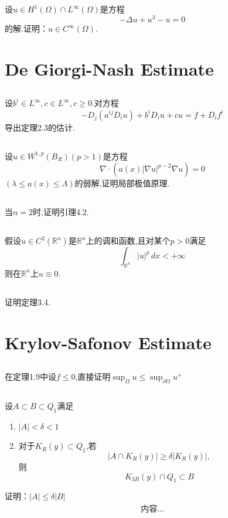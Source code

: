 \documentclass{ctexart}
\numberwithin{equation}{section}
\theoremstyle{plain}
\theoremstyle{plain}
\numberwithin{equation}{section}
\theoremstyle{remark}
\begin{document}
\subsection{}
设$u \in H^1(\Omega) \cap L^{\infty}(\Omega)$是方程
$$-\Delta u+u^3-u=0$$
的解.证明：$u \in C^{\infty}(\Omega)$.

\section{De Giorgi-Nash Estimate}
\subsection{}
设$b^i \in L^{\infty},c \in L^{\infty},c \geqslant 0 .$对方程
$$-D_j(a^{ij}D_iu)+b^iD_iu+cu=f+D_if^i$$
导出定理2.3的估计.
\subsection{}
设$u \in W^{1,p}(B_R)(p>1)$是方程
$$\nabla \cdot(a(x)|\nabla u|^{p-2}\nabla u)=0$$
$(\lambda \leqslant a(x) \leqslant \Lambda)$的弱解,证明局部极值原理.
\subsection{}
当$n=2$时,证明引理4.2.
\subsection{}
假设$u \in C^2(\mathbb{R}^n)$是$\mathbb{R}^n$上的调和函数,且对某个$p>0$满足
$$\int_{\mathbb{R}^n}|u|^p\,dx<+\infty$$
则在$\mathbb{R}^n$上$u\equiv 0$.
\subsection{}
证明定理3.4.
\section{Krylov-Safonov Estimate}
\subsection{}
在定理1.9中设$f \leqslant 0$,直接证明$\sup_{\Omega}u \leqslant \sup_{\partial\Omega}u^+$
\subsection{}
设$A \subset B \subset Q_1$满足
\begin{enumerate}
	\item $|A|< \delta <1$
	\item 对于$K_R(y) \subset Q_1$,若$$|A \cap K_R(y)|\geqslant \delta|K_R(y)|,$$则$$K_{3R}(y) \cap Q_1 \subset B$$
\end{enumerate}
证明：$|A| \leqslant \delta |B|$
\begin{equation*}
\begin{aligned}
内容...
\end{aligned}
\end{equation*}
             
\end{document}
